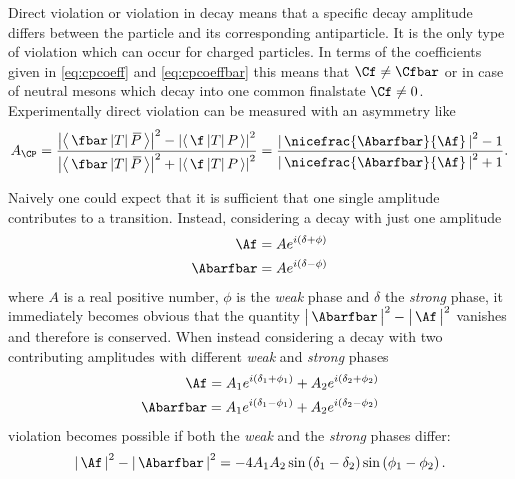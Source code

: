 Direct \CP violation or \CP violation in decay means that a specific decay amplitude differs between the particle and its corresponding antiparticle.
It is the only type of \CP violation which can occur for charged particles.
In terms of the \CP coefficients given in \cref{eq:cpcoeff} and \cref{eq:cpcoeffbar} this means that $\Cf\neq\Cfbar$ or in case of neutral mesons which decay into one common finalstate $\Cf\neq0$.
Experimentally direct \CP violation can be measured with an asymmetry like
\begin{equation}
A_{\CP}=\frac{\left|\left<\,\fbar\,|T|\,\kern 0.18em\overline{\kern -0.18em P}\,\right>\right|^2-\left|\left<\,\f\,|T|\,P\,\right>\right|^2}{\left|\left<\,\fbar\,|T|\,\kern 0.18em\overline{\kern -0.18em P}\,\right>\right|^2+\left|\left<\,\f\,|T|\,P\,\right>\right|^2} = \frac{\left|\,\nicefrac{\Abarfbar}{\Af}\,\right|^2-1}{\left|\,\nicefrac{\Abarfbar}{\Af}\,\right|^2+1}.
\end{equation}

Naively one could expect that it is sufficient that one single amplitude contributes to a transition.
Instead, considering a decay with just one amplitude
\begin{equation}
\begin{split}
\Af&=Ae^{i\left(\delta+\phi\right)}\\
\Abarfbar&=Ae^{i\left(\delta-\phi\right)}
\end{split}
\end{equation}
where $A$ is a real positive number, $\phi$ is the \emph{weak} phase and $\delta$ the \emph{strong} phase, it immediately becomes obvious that the quantity $\big|\,\Abarfbar\,\big|^2-\big|\,\Af\,\big|^2$ vanishes and therefore \CP is conserved.
When instead considering a decay with two contributing amplitudes with different \emph{weak} and \emph{strong} phases
\begin{equation}
\begin{split}
\Af=A_1e^{i\left(\delta_1+\phi_1\right)}+A_2e^{i\left(\delta_2+\phi_2\right)}\\
\Abarfbar=A_1e^{i\left(\delta_1-\phi_1\right)}+A_2e^{i\left(\delta_2-\phi_2\right)}
\end{split}
\end{equation}
\CP violation becomes possible if both the \emph{weak} and the \emph{strong} phases differ:
\begin{equation}
\left|\,\Af\,\right|^2-\left|\,\Abarfbar\,\right|^2=-4A_1A_2\sin\left(\delta_1-\delta_2\right)\sin\left(\phi_1-\phi_2\right).
\end{equation}

